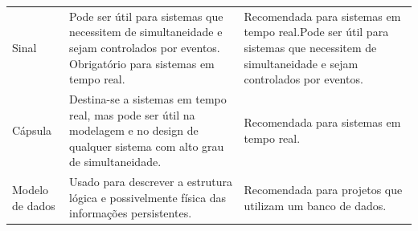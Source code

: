 \begin{table}[]
\begin{tabular}{lll}
Sinal                                              & Pode ser útil para sistemas que necessitem de simultaneidade e sejam controlados por eventos. Obrigatório para sistemas em tempo real.                                                                                                                                                                                                                                                                            & Recomendada para sistemas em tempo real.Pode ser útil para sistemas que necessitem de simultaneidade e sejam controlados por eventos.                                                                                                                                                                                                                                            \\
Cápsula                                            & Destina-se a sistemas em tempo real, mas pode ser útil na modelagem e no design de qualquer sistema com alto grau de simultaneidade.                                                                                                                                                                                                                                                                              & Recomendada para sistemas em tempo real.                                                                                                                                                                                                                                                                                                                                         \\
Modelo de dados                                    & Usado para descrever a estrutura lógica e possivelmente física das informações persistentes.                                                                                                                                                                                                                                                                                                                      & Recomendada para projetos que utilizam um banco de dados.                                                                                                                                                                                                                                                                                                                        \\

\end{tabular}
\end{table}

